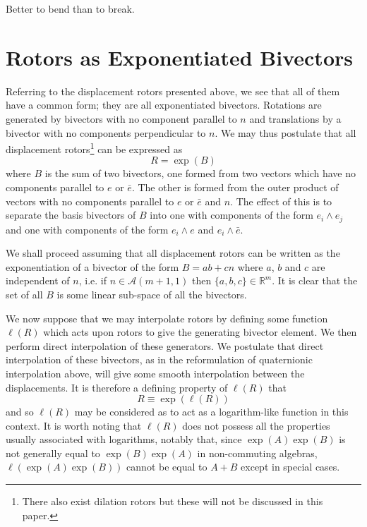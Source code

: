 \begin{savequote}
Better to bend than to break.
\end{savequote}

\chapter{Rotors as Exponentiated Bivectors}

Referring to the displacement rotors presented above, we
see that all of them have a common form; they are all exponentiated bivectors.
Rotations are generated by bivectors with no component parallel to
$n$ and translations by a bivector with no components perpendicular to $n$. We
may thus postulate that all displacement rotors\footnote{There also exist dilation rotors but 
these will not be discussed in this paper.} can be expressed as
\[
R = \exp(B)
\]
where $B$ is the sum of two bivectors, one formed from two vectors which have no
components parallel to $e$ or $\bar{e}$. The other is formed from the outer product 
of vectors with no components parallel to $e$ or $\bar{e}$ and $n$. The effect of this
is to separate the basis bivectors of $B$ into one with components of the form $e_i \wedge e_j$
and one with components of the form $e_i \wedge e$ and $e_i \wedge \bar{e}$.

We shall proceed assuming that all displacement rotors can be written as
the exponentiation of a bivector of the form $B = ab + cn$ where $a$, $b$ and
$c$ are independent of $n$, i.e. if $n \in \mathcal{A}(m+1,1)$ then $\{a,b,c\} \in \mathbb{R}^m$.
It is clear that the set of all $B$ is some
linear sub-space of all the bivectors.

We now suppose that we may interpolate rotors by defining
some function $\ell(R)$ which acts upon rotors to give the generating
bivector element. We then perform direct interpolation of these generators. We postulate that
direct interpolation of these bivectors, as in the reformulation of quaternionic interpolation
above, will give some smooth interpolation between the displacements.
It is therefore a defining property of $\ell(R)$ that
\begin{equation}
R \equiv \exp(\ell(R))
\end{equation}
and so $\ell(R)$ may be considered as to act as a logarithm-like function in this context.
It is worth noting that $\ell(R)$ does not possess all the properties usually associated with logarithms, notably that, since $\exp(A)\exp(B)$ is not generally equal to $\exp(B)\exp(A)$ in non-commuting algebras,
$\ell(\exp(A)\exp(B))$ cannot be equal to $A + B$ except in special cases.

